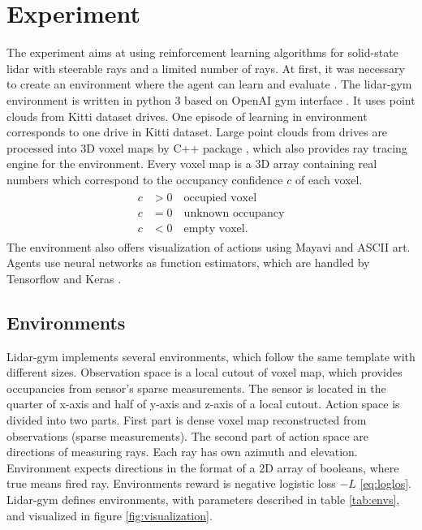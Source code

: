 \section{Experiment}
The experiment aims at using reinforcement learning algorithms for solid-state lidar with steerable rays and a limited number of rays. At first, it was necessary to create an environment where the agent can learn and evaluate \cite{rozsypalek2018}. The lidar-gym environment is written in python 3 based on OpenAI gym interface \cite{openai2016}. It uses point clouds from Kitti dataset drives\cite{geiger2013}. One episode of learning in environment corresponds to one drive in Kitti dataset. Large point clouds from drives are processed into 3D voxel maps by C++ package \cite{petricek2017}, which also provides ray tracing engine for the environment. Every voxel map is a 3D array containing real numbers which correspond to the occupancy confidence $c$ of each voxel.
\begin{align}
\begin{split}
c &> 0 \quad \text{occupied voxel} \\
c &= 0 \quad \text{unknown occupancy} \\
c &< 0 \quad \text{empty voxel.}
\end{split}
\end{align}
The environment also offers visualization of actions using Mayavi \cite{mayavi2011} and ASCII art. Agents use neural networks as function estimators, which are handled by Tensorflow \cite{tensorflow2015} and Keras \cite{keras2015}.

\subsection{Environments}
Lidar-gym implements several environments, which follow the same template with different sizes. Observation space is a local cutout of voxel map, which provides occupancies from sensor's sparse measurements. The sensor is located in the quarter of x-axis and half of y-axis and z-axis of a local cutout. Action space is divided into two parts. First part is dense voxel map reconstructed from observations (sparse measurements). The second part of action space are directions of measuring rays. Each ray has own azimuth and elevation. Environment expects directions in the format of a 2D array of booleans, where true means fired ray. Environments reward is negative logistic loss $-L$ \eqref{eq:loglos}. Lidar-gym defines environments, with parameters described in table \ref{tab:envs}, and visualized in figure \ref{fig:visualization}. 

